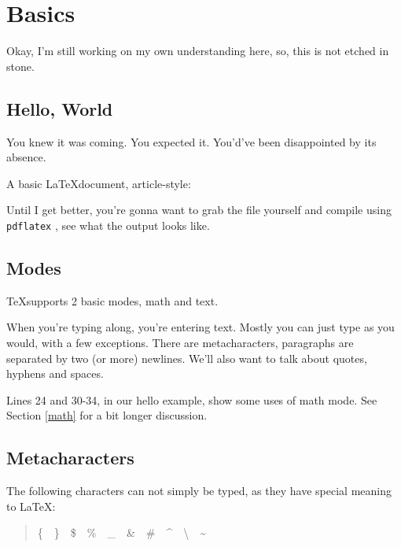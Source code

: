 
\chapter{Basics}
\label{basics} 

Okay, I'm still working on my own understanding here, so, this is not etched
in stone.


\section{Hello, World}
\label{hello}

You knew it was coming.  You expected it.  You'd've been disappointed by its
absence.


A basic \LaTeX document, article-style:



Until I get better, you're gonna want to grab the file yourself and compile
using \texttt{pdflatex} , see what the output looks like.

%
%

\section{Modes}
\label{modes-intro}

\TeX supports 2 basic modes, math and text.

When you're typing along, you're entering text.  Mostly you can just type as
you would, with a few exceptions.  There are metacharacters, paragraphs are
separated by two (or more) newlines.  We'll also want to talk about quotes,
hyphens and spaces.

Lines 24 and 30-34, in our hello example, show some uses of math mode.
See Section \ref{math} for a bit longer discussion.


\section{Metacharacters}
\label{metacharacters}

The following characters can not simply be typed, as they have special
meaning to \LaTeX{}:

\begin{quote}
	\{~~\}~~\$~~\%~~\_~~\&~~\#~~\^{}~~\textbackslash{}~~\~{}
\end{quote}

